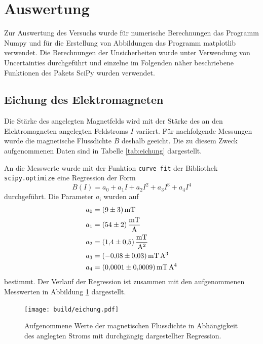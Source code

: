\newpage
\section{Auswertung}
\label{sec:Auswertung}

Zur Auswertung des Versuchs wurde für numerische Berechnungen das Programm Numpy \cite{numpy} und
für die Erstellung von Abbildungen das Programm matplotlib \cite{matplotlib} verwendet.
Die Berechnungen der Unsicherheiten wurde unter Verwendung von Uncertainties \cite{uncertainties}
durchgeführt und einzelne im Folgenden näher beschriebene Funktionen des
Pakets SciPy \cite{scipy} wurden verwendet.

\subsection{Eichung des Elektromagneten}
\label{sec:AuswEichung}

Die Stärke des angelegten Magnetfelds wird mit der Stärke des an den Elektromagneten angelegten
Feldstroms $I$ variiert.
Für nachfolgende Messungen wurde die magnetische Flussdichte $B$ deshalb geeicht.
Die zu diesem Zweck aufgenommenen Daten sind in Tabelle \ref{tab:eichung} dargestellt.

An die Messwerte wurde mit der Funktion \texttt{curve\_fit} der Bibliothek
\texttt{scipy.optimize} eine Regression der Form
\begin{equation*}
  B\!\left(I\right) = a_0 + a_1 I + a_2 I^2 + a_3 I^3 + a_4 I^4
\end{equation*}
durchgeführt.
Die Parameter $a_\text{i}$ wurden auf
\begin{align*}
  a_0 &= \SI{9(3)}{\milli\tesla} \\
  a_1 &= \SI{54(2)}{\milli\tesla\per\ampere} \\
  a_2 &= \SI{1.4(5)}{\milli\tesla\per\ampere\squared} \\
  a_3 &= \SI{-0.08(3)}{\milli\tesla\per\raiseto{-3}\ampere} \\
  a_4 &= \SI{0.0001(9)}{\milli\tesla\per\raiseto{-4}\ampere} \\
\end{align*}
bestimmt.
Der Verlauf der Regression ist zusammen mit den aufgenommenen Messwerten in
Abbildung \ref{fig:eichung} dargestellt.

\begin{figure}
	\centering
	\texttt{[image: build/eichung.pdf]}
	\caption{Aufgenommene Werte der magnetischen Flussdichte in Abhängigkeit des
	anglegten Stroms mit durchgängig dargestellter Regression.}
	\label{fig:eichung}
\end{figure}


